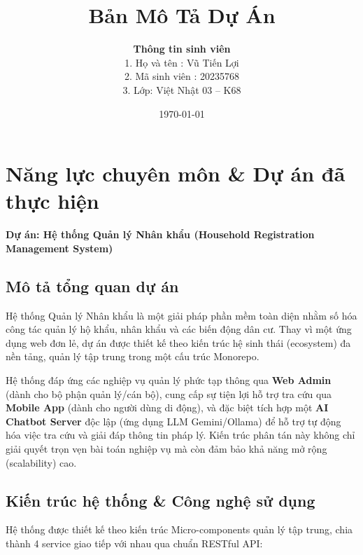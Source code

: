 \documentclass[12pt,a4paper]{article}
\title{\textbf{Bản Mô Tả Dự Án}}
\author{
    \textbf{Thông tin sinh viên} \\
    1. Họ và tên : Vũ Tiến Lợi \\
    2. Mã sinh viên : 20235768 \\
    3. Lớp: Việt Nhật 03 -- K68
}
\date{\today}
\begin{document}
\maketitle
\tableofcontents
\newpage

\section{Năng lực chuyên môn \& Dự án đã thực hiện}

\noindent \textbf{\Large Dự án: Hệ thống Quản lý Nhân khẩu (Household Registration Management System)}
\vspace{0.3cm}

\subsection{Mô tả tổng quan dự án}
Hệ thống Quản lý Nhân khẩu là một giải pháp phần mềm toàn diện nhằm số hóa công tác quản lý hộ khẩu, nhân khẩu và các biến động dân cư. Thay vì một ứng dụng web đơn lẻ, dự án được thiết kế theo kiến trúc hệ sinh thái (ecosystem) đa nền tảng, quản lý tập trung trong một cấu trúc Monorepo. 

Hệ thống đáp ứng các nghiệp vụ quản lý phức tạp thông qua \textbf{Web Admin} (dành cho bộ phận quản lý/cán bộ), cung cấp sự tiện lợi hỗ trợ tra cứu qua \textbf{Mobile App} (dành cho người dùng di động), và đặc biệt tích hợp một \textbf{AI Chatbot Server} độc lập (ứng dụng LLM Gemini/Ollama) để hỗ trợ tự động hóa việc tra cứu và giải đáp thông tin pháp lý. Kiến trúc phân tán này không chỉ giải quyết trọn vẹn bài toán nghiệp vụ mà còn đảm bảo khả năng mở rộng (scalability) cao.

\subsection{Kiến trúc hệ thống \& Công nghệ sử dụng}
Hệ thống được thiết kế theo kiến trúc Micro-components quản lý tập trung, chia thành 4 service giao tiếp với nhau qua chuẩn RESTful API:
\end{document}
